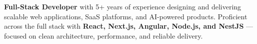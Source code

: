 \documentclass[]{deedy-resume-reversed}
\begin{document}
\vspace{-4pt}
\begin{center}
\small \textbf{Full-Stack Developer} with 5+ years of experience designing and delivering scalable web applications, SaaS platforms, and AI-powered products. Proficient across the full stack with \textbf{React, Next.js, Angular, Node.js, and NestJS} --- focused on clean architecture, performance, and reliable delivery.
\end{center}
\vspace{-6pt}
\end{document}
